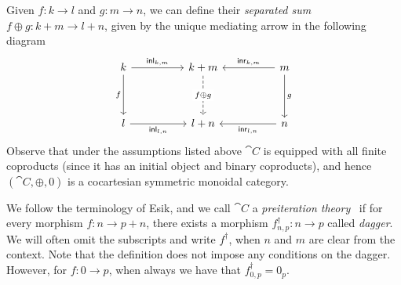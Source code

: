 Given $f \colon k \to l$ and $g \colon m \to n$, we can define their \emph{separated sum} $f \oplus g \colon k + m \to l + n $, given by the unique mediating arrow in the following diagram
\begin{equation}\begin{tikzcd}\label{eqn:monoidal}
	k && {k + m} && m \\
	\\
	l && {l + n} && n
	\arrow["\inl_{k,m}", from=1-1, to=1-3]
	\arrow["f"', from=1-1, to=3-1]
	\arrow["{f \oplus g}"{description}, dashed, from=1-3, to=3-3]
	\arrow["\inr_{k,m}"', from=1-5, to=1-3]
	\arrow["g", from=1-5, to=3-5]
	\arrow["\inl_{l,n}"', from=3-1, to=3-3]
	\arrow["\inr_{l,n}", from=3-5, to=3-3]
\end{tikzcd}\end{equation}
Observe that under the assumptions listed above $\cat{C}$ is equipped with all finite coproducts (since it has an initial object and binary coproducts), and hence $(\cat{C}, \oplus , 0 )$ is a cocartesian symmetric monoidal category. 

We follow the terminology of Esik, and we call $\cat{C}$ a \emph{preiteration theory}~\cite{Esik:1999:Group} if for every morphism $f \colon n \to p + n$, there exists a morphism $f^\dagger_{n,p} \colon n \to p$ called \emph{dagger}. We will often omit the subscripts and write $f^\dagger$, when $n$ and $m$ are clear from the context. Note that the definition does not impose any conditions on the dagger. However, for $f \colon 0 \to p$, when always we have that $f_{0,p}^\dagger = 0_p$.
 
